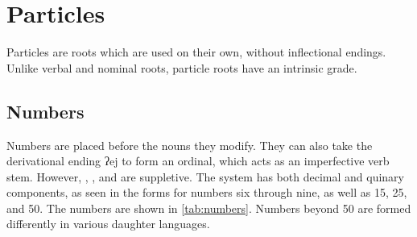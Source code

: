 \section{Particles}
Particles are roots which are used on their own, without inflectional endings.
Unlike verbal and nominal roots, particle roots have an intrinsic grade.

\subsection{Numbers}
Numbers are placed before the nouns they modify. They can also take the
derivational ending {\ll ʔej} to form an ordinal, which acts as an imperfective
verb stem. However, , , and  are suppletive. The
system has both decimal and quinary components, as seen in the forms for
numbers six through nine, as well as 15, 25, and 50. The numbers are shown in
\cref{tab:numbers}. Numbers beyond 50 are formed differently in various
daughter languages.


